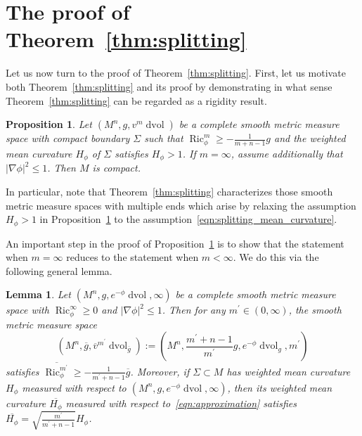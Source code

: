 \documentclass{amsart}
\newtheorem{prop}[thm]{Proposition}
\newtheorem{lem}[thm]{Lemma}
\theoremstyle{definition}
\theoremstyle{remark}
\numberwithin{equation}{section}
\begin{document}
\section{The proof of Theorem~\ref{thm:splitting}}
\label{sec:splitting}

Let us now turn to the proof of Theorem~\ref{thm:splitting}.  First, let us motivate both Theorem~\ref{thm:splitting} and its proof by demonstrating in what sense Theorem~\ref{thm:splitting} can be regarded as a rigidity result.

\begin{prop}
\label{prop:strong_cg}
Let $(M^n,g,v^m\operatorname{dvol})$ be a complete smooth metric measure space with compact boundary $\Sigma$ such that $\operatorname{Ric}_\phi^m\geq-\frac{1}{m+n-1}g$ and the weighted mean curvature $H_\phi$ of $\Sigma$ satisfies $H_\phi>1$.  If $m=\infty$, assume additionally that ${\lvert}\nabla\phi{\rvert}^2\leq 1$.  Then $M$ is compact.
\end{prop}

In particular, note that Theorem~\ref{thm:splitting} characterizes those smooth metric measure spaces with multiple ends which arise by relaxing the assumption $H_\phi>1$ in Proposition~\ref{prop:strong_cg} to the assumption~\eqref{eqn:splitting_mean_curvature}.

An important step in the proof of Proposition~\ref{prop:strong_cg} is to show that the statement when $m=\infty$ reduces to the statement when $m<\infty$.  We do this via the following general lemma.

\begin{lem}
\label{lem:approximation}
Let $(M^n,g,e^{-\phi}\operatorname{dvol},\infty)$ be a complete smooth metric measure space with $\operatorname{Ric}_\phi^\infty\geq0$ and ${\lvert}\nabla\phi{\rvert}^2\leq1$.  Then for any $m^\prime\in(0,\infty)$, the smooth metric measure space
\begin{equation}
\label{eqn:approximation}
\left( M^n,{\overline{g}},{\overline{v}}^{m^\prime}\operatorname{dvol}_{\overline{g}} \right) := \left( M^n,\frac{m^\prime+n-1}{m^\prime}g, e^{-\phi}\operatorname{dvol}_g, m^\prime \right)
\end{equation}
satisfies $\overline{\operatorname{Ric}_\phi^{m^\prime}}\geq-\frac{1}{m^\prime+n-1}{\overline{g}}$.  Moreover, if $\Sigma\subset M$ has weighted mean curvature $H_\phi$ measured with respect to $(M^n,g,e^{-\phi}\operatorname{dvol},\infty)$, then its weighted mean curvature $\overline{H_\phi}$ measured with respect to~\eqref{eqn:approximation} satisfies $\overline{H_\phi}=\sqrt{\frac{m^\prime}{m^\prime+n-1}}H_\phi$.
\end{lem}
\end{document}
